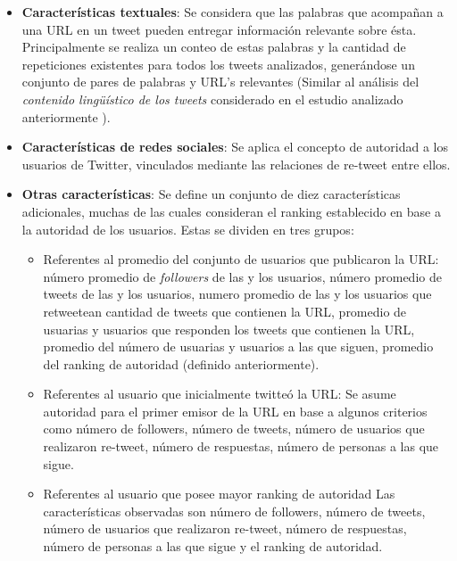 \begin{itemize}
	\item \textbf{Características textuales}: Se considera que las palabras que acompañan a una URL en un tweet pueden entregar información relevante sobre ésta. Principalmente se realiza un conteo de estas palabras y la cantidad de repeticiones existentes para todos los tweets analizados, generándose un conjunto de pares de palabras y URL's relevantes (Similar al análisis del \emph{contenido lingüístico de los tweets} considerado en el estudio analizado anteriormente \cite{PennacchiottiP11}).
	
	\item \textbf{Características de redes sociales}: Se aplica el concepto de autoridad a los usuarios de Twitter, vinculados mediante las relaciones de re-tweet entre ellos.
	
	\item \textbf{Otras características}: Se define un conjunto de diez características adicionales, muchas de las cuales consideran el ranking establecido en base a la autoridad de los usuarios. Estas se dividen en tres grupos:
		\begin{itemize}
		\item{Referentes al promedio del conjunto de usuarios que publicaron la URL}: número promedio de \emph{followers} de las y los usuarios, número promedio de tweets de las y los usuarios, numero promedio de las y los usuarios que retweetean cantidad de tweets que contienen la URL, promedio de usuarias y usuarios que responden los tweets que contienen la URL, promedio del número de usuarias y usuarios a las que siguen, promedio del ranking de autoridad (definido anteriormente).
		\item{Referentes al usuario que inicialmente twitteó la URL}: Se asume autoridad para el primer emisor de la URL en base a algunos criterios como número de followers, número de tweets, número de usuarios que realizaron re-tweet, número de respuestas, número de personas a las que sigue.
		\item{Referentes al usuario que posee mayor ranking de autoridad} Las características observadas son número de followers, número de tweets, número de usuarios que realizaron re-tweet, número de respuestas, número de personas a las que sigue y el ranking de autoridad.
		\end{itemize}
\end{itemize}
	
